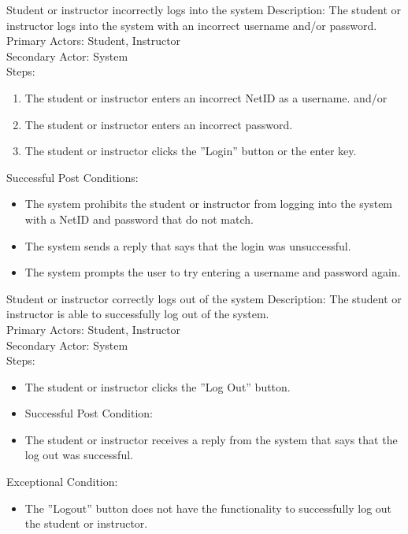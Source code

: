         \begin{section}{Student or instructor incorrectly logs into the system}
    Description: The student or instructor logs into the system with an incorrect username and/or password.\\
    Primary Actors: Student, Instructor\\
    Secondary Actor: System\\
    Steps:
        \begin{enumerate}
            \item The student or instructor enters an incorrect NetID as a username.
            	and/or
            \item The student or instructor enters an incorrect password.
            \item The student or instructor clicks the ''Login'' button or the enter key.\\
        \end{enumerate}
    Successful Post Conditions:
        \begin{itemize}
            \item The system prohibits the student or instructor from logging into the system with a NetID and password that do not match.
            \item The system sends a reply that says that the login was unsuccessful.
            \item The system prompts the user to try entering a username and password again.
        \end{itemize}
    \end{section}



    \begin{section}{Student or instructor correctly logs out of the system}
        Description: The student or instructor is able to successfully log out of the system.\\
        Primary Actors: Student, Instructor\\
        Secondary Actor: System\\
        Steps:
        \begin{itemize}
            \item The student or instructor clicks the ''Log Out'' button.
            \item Successful Post Condition:
            \item The student or instructor receives a reply from the system that says that the log out was successful.
        \end{itemize}
        Exceptional Condition:
        \begin{itemize}
            \item The ''Logout'' button does not have the functionality to successfully log out the student or instructor.
        \end{itemize}
    \end{section}






